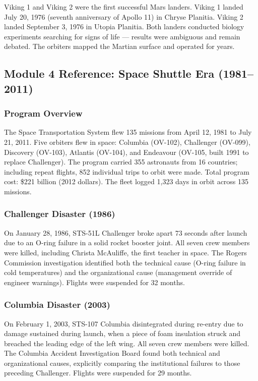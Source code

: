\documentclass[11pt,letterpaper]{article}
\begin{document}
Viking 1 and Viking 2 were the first successful Mars landers. Viking 1 landed July 20, 1976 (seventh anniversary of Apollo 11) in Chryse Planitia. Viking 2 landed September 3, 1976 in Utopia Planitia. Both landers conducted biology experiments searching for signs of life --- results were ambiguous and remain debated. The orbiters mapped the Martian surface and operated for years.

\subsection{Module 4 Reference: Space Shuttle Era (1981--2011)}

\subsubsection{Program Overview}

The Space Transportation System flew 135 missions from April 12, 1981 to July 21, 2011. Five orbiters flew in space: Columbia (OV-102), Challenger (OV-099), Discovery (OV-103), Atlantis (OV-104), and Endeavour (OV-105, built 1991 to replace Challenger). The program carried 355 astronauts from 16 countries; including repeat flights, 852 individual trips to orbit were made. Total program cost: \$221 billion (2012 dollars). The fleet logged 1,323 days in orbit across 135 missions.

\subsubsection{Challenger Disaster (1986)}

On January 28, 1986, STS-51L Challenger broke apart 73 seconds after launch due to an O-ring failure in a solid rocket booster joint. All seven crew members were killed, including Christa McAuliffe, the first teacher in space. The Rogers Commission investigation identified both the technical cause (O-ring failure in cold temperatures) and the organizational cause (management override of engineer warnings). Flights were suspended for 32 months.

\subsubsection{Columbia Disaster (2003)}

On February 1, 2003, STS-107 Columbia disintegrated during re-entry due to damage sustained during launch, when a piece of foam insulation struck and breached the leading edge of the left wing. All seven crew members were killed. The Columbia Accident Investigation Board found both technical and organizational causes, explicitly comparing the institutional failures to those preceding Challenger. Flights were suspended for 29 months.
\end{document}
